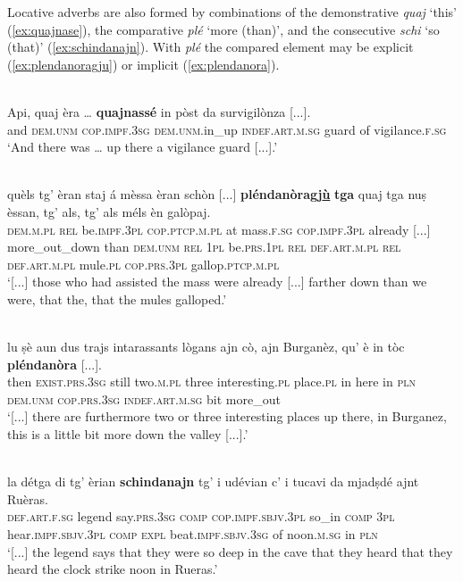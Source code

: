 Locative adverbs are also formed by combinations of the demonstrative \textit{quaj} `this' (\ref{ex:quajnase}), the comparative \textit{plé} `more (than)', and the consecutive \textit{schi} `so (that)' (\ref{ex:schindanajn}). With \textit{plé} the compared element may be explicit (\ref{ex:plendanoragju}) or implicit (\ref{ex:plendanora}).

\ea
\label{ex:quajnase}
\\
\gll  Api, quaj èra … \textbf{quajnassé} in pòst da survigilònza [...].\\
and \textsc{dem.unm} \textsc{cop.impf.3sg} {} \textsc{dem.unm}.in\_up \textsc{indef.art.m.sg} guard of vigilance.\textsc{f.sg}\\
\glt `And there was … up there a vigilance guard [...].'
\z

\ea
\label{ex:plendanoragju}
\\
\gll  [...] quèls tg’ èran staj á mèssa èran schòn [...] \textbf{pléndanòragj\underline{ù}} \textbf{tga} quaj tga nuṣ èssan, tg’ als, tg’ als méls èn galòpaj.\\
{} \textsc{dem.m.pl} \textsc{rel} be.\textsc{impf.3pl} \textsc{cop.ptcp.m.pl} at mass.\textsc{f.sg} \textsc{cop.impf.3pl} already [...] more\_out\_down than \textsc{dem.unm} \textsc{rel} \textsc{1pl} be.\textsc{prs.1pl} \textsc{rel} \textsc{def.art.m.pl} \textsc{rel} \textsc{def.art.m.pl} mule.\textsc{pl} \textsc{cop.prs.3pl} gallop.\textsc{ptcp.m.pl}\\
\glt `[...] those who had assisted the mass were already [...] farther down than we were, that the, that the mules galloped.'
\z

\ea
\label{ex:plendanora}
\\
\gll [...] lu ṣè aun dus trajs intarassants lògans ajn cò, ajn Burganèz, qu' è in tòc \textbf{pléndanòra} [...].\\
{}  then \textsc{exist.prs.3sg} still two.\textsc{m.pl} three interesting.\textsc{pl} place.\textsc{pl} in here in \textsc{pln} \textsc{dem.unm} \textsc{cop.prs.3sg} \textsc{indef.art.m.sg} bit more\_out \\
\glt `[...] there are furthermore two or three interesting places up there, in Burganez, this is a little bit more down the valley [...].'
\z

\ea
\label{ex:schindanajn}
\\
\gll [...] la détga di tg’ èrian \textbf{schindanajn} tg' i udévian c’ i tucavi da mjadṣdé ajnt Ruèras.\\
{} \textsc{def.art.f.sg} legend say.\textsc{prs.3sg}  \textsc{comp} \textsc{cop.impf.sbjv.3pl} so\_in \textsc{comp} \textsc{3pl} hear.\textsc{impf.sbjv.3pl} \textsc{comp} \textsc{expl} beat.\textsc{impf.sbjv.3sg} of noon.\textsc{m.sg} in \textsc{pln}\\
\glt `[...] the legend says that they were so deep in the cave that they heard that they heard the clock strike noon in Rueras.'
\z

